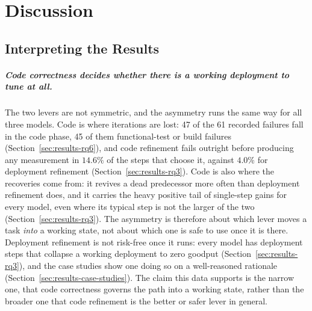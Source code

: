 
\chapter{Discussion}
\label{ch:discussion}


\section{Interpreting the Results}
\label{sec:discussion-interpretation}

\paragraph{Code correctness decides whether there is a working deployment
to tune at all.} The two levers are not symmetric, and the asymmetry runs
the same way for all three models. Code is where iterations are lost: 47
of the 61 recorded failures fall in the code phase, 45 of them
functional-test or build failures (Section~\ref{sec:results-rq6}), and
code refinement fails outright before producing any measurement in
$14.6\%$ of the steps that choose it, against $4.0\%$ for deployment
refinement (Section~\ref{sec:results-rq3}). Code is also where the
recoveries come from: it revives a dead predecessor more often than
deployment refinement does, and it carries the heavy positive tail of
single-step gains for every model, even where its typical step is not the
larger of the two (Section~\ref{sec:results-rq3}). The asymmetry is
therefore about which lever moves a task \emph{into} a working state, not
about which one is safe to use once it is there. Deployment refinement is
not risk-free once it runs: every model has deployment steps that collapse
a working deployment to zero goodput (Section~\ref{sec:results-rq3}), and
the case studies show one doing so on a well-reasoned rationale
(Section~\ref{sec:results-case-studies}). The claim this data supports is
the narrow one, that code correctness governs the path into a working
state, rather than the broader one that code refinement is the better or
safer lever in general.

